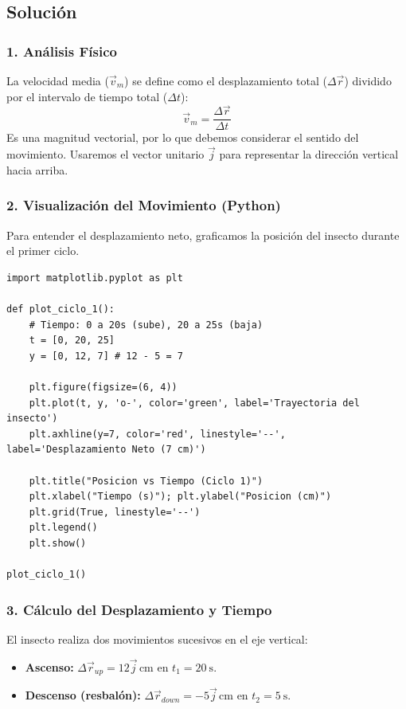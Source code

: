 \documentclass[12pt, a4paper]{article}
\begin{document}
\subsection*{Solución}

\subsubsection*{1. Análisis Físico}
La velocidad media ($\vec{v}_m$) se define como el desplazamiento total ($\Delta \vec{r}$) dividido por el intervalo de tiempo total ($\Delta t$):
\begin{equation}
    \vec{v}_m = \frac{\Delta \vec{r}}{\Delta t}
\end{equation}
Es una magnitud vectorial, por lo que debemos considerar el sentido del movimiento. Usaremos el vector unitario $\vec{j}$ para representar la dirección vertical hacia arriba.

\subsubsection*{2. Visualización del Movimiento (Python)}
Para entender el desplazamiento neto, graficamos la posición del insecto durante el primer ciclo.

\begin{lstlisting}
import matplotlib.pyplot as plt

def plot_ciclo_1():
    # Tiempo: 0 a 20s (sube), 20 a 25s (baja)
    t = [0, 20, 25]
    y = [0, 12, 7] # 12 - 5 = 7
    
    plt.figure(figsize=(6, 4))
    plt.plot(t, y, 'o-', color='green', label='Trayectoria del insecto')
    plt.axhline(y=7, color='red', linestyle='--', label='Desplazamiento Neto (7 cm)')
    
    plt.title("Posicion vs Tiempo (Ciclo 1)")
    plt.xlabel("Tiempo (s)"); plt.ylabel("Posicion (cm)")
    plt.grid(True, linestyle='--')
    plt.legend()
    plt.show()

plot_ciclo_1()
\end{lstlisting}

\subsubsection*{3. Cálculo del Desplazamiento y Tiempo}
El insecto realiza dos movimientos sucesivos en el eje vertical:
\begin{itemize}
    \item \textbf{Ascenso:} $\Delta \vec{r}_{up} = 12\vec{j} \, \si{\centi\metre}$ en $t_1 = \SI{20}{\second}$.
    \item \textbf{Descenso (resbalón):} $\Delta \vec{r}_{down} = -5\vec{j} \, \si{\centi\metre}$ en $t_2 = \SI{5}{\second}$.
\end{itemize}
\end{document}
